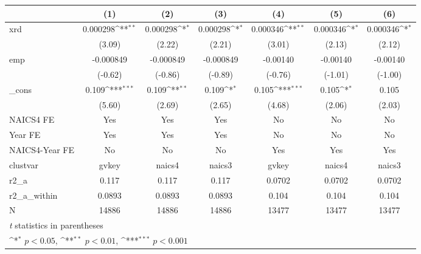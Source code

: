{
\def\sym#1{\ifmmode^{#1}\else\(^{#1}\)\fi}
\begin{tabular}{l*{6}{c}}
\hline\hline
            &\multicolumn{1}{c}{(1)}         &\multicolumn{1}{c}{(2)}         &\multicolumn{1}{c}{(3)}         &\multicolumn{1}{c}{(4)}         &\multicolumn{1}{c}{(5)}         &\multicolumn{1}{c}{(6)}         \\
\hline
xrd         &    0.000298\sym{**} &    0.000298\sym{*}  &    0.000298\sym{*}  &    0.000346\sym{**} &    0.000346\sym{*}  &    0.000346\sym{*}  \\
            &      (3.09)         &      (2.22)         &      (2.21)         &      (3.01)         &      (2.13)         &      (2.12)         \\
[1em]
emp         &   -0.000849         &   -0.000849         &   -0.000849         &    -0.00140         &    -0.00140         &    -0.00140         \\
            &     (-0.62)         &     (-0.86)         &     (-0.89)         &     (-0.76)         &     (-1.01)         &     (-1.00)         \\
[1em]
\_cons      &       0.109\sym{***}&       0.109\sym{**} &       0.109\sym{*}  &       0.105\sym{***}&       0.105\sym{*}  &       0.105         \\
            &      (5.60)         &      (2.69)         &      (2.65)         &      (4.68)         &      (2.06)         &      (2.03)         \\
[1em]
NAICS4 FE   &         Yes         &         Yes         &         Yes         &          No         &          No         &          No         \\
[1em]
Year FE     &         Yes         &         Yes         &         Yes         &          No         &          No         &          No         \\
[1em]
NAICS4-Year FE&          No         &          No         &          No         &         Yes         &         Yes         &         Yes         \\
\hline
clustvar    &       gvkey         &      naics4         &      naics3         &       gvkey         &      naics4         &      naics3         \\
r2\_a        &       0.117         &       0.117         &       0.117         &      0.0702         &      0.0702         &      0.0702         \\
r2\_a\_within &      0.0893         &      0.0893         &      0.0893         &       0.104         &       0.104         &       0.104         \\
N           &       14886         &       14886         &       14886         &       13477         &       13477         &       13477         \\
\hline\hline
\multicolumn{7}{l}{\footnotesize \textit{t} statistics in parentheses}\\
\multicolumn{7}{l}{\footnotesize \sym{*} \(p<0.05\), \sym{**} \(p<0.01\), \sym{***} \(p<0.001\)}\\
\end{tabular}
}
